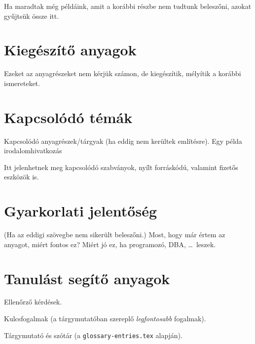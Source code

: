 Ha maradtak még példáink, amit a korábbi részbe nem tudtunk beleszőni, azokat gyűjtsük össze itt.

\section{Kiegészítő anyagok}

Ezeket az anyagrészeket nem kérjük számon, de kiegészítik, mélyítik a korábbi ismereteket.

\section{Kapcsolódó témák}

Kapcsolódó anyagrészek/tárgyak (ha eddig nem kerültek említésre). Egy példa irodalomhivatkozás~\cite{DBLP:books/cs/Ullman88}

Itt jelenhetnek meg kapcsolódó szabványok, nyílt forráskódú, valamint fizetős eszközök is.

\section{Gyarkorlati jelentőség}

(Ha az eddigi szövegbe nem sikerült beleszőni.) Most, hogy már értem az anyagot, miért fontos ez? Miért jó ez, ha programozó, DBA, \ldots\ leszek.

\section{Tanulást segítő anyagok}

Ellenőrző kérdések.

Kulcsfogalmak (a tárgymutatóban szereplő \emph{legfontosabb} fogalmak).

Tárgymutató és szótár (a \texttt{glossary-entries.tex} alapján).
